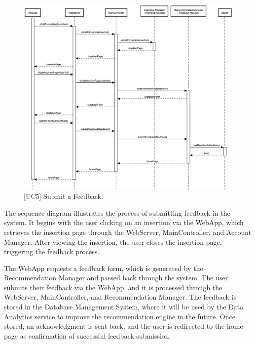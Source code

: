 \newpage

\begin{figure}[htbp]
    \centering
    \includegraphics[width=\linewidth]{DD/Images/sequenceDiagrams/SubmitFeedback.png}
    \caption{[UC5] Submit a Feedback.}
    \label{fig:submitFeedback_immagine}
\end{figure}


The sequence diagram illustrates the process of submitting feedback in the system. It begins with the user clicking on an insertion via the WebApp, which retrieves the insertion page through the WebServer, MainController, and Account Manager. After viewing the insertion, the user closes the insertion page, triggering the feedback process.

The WebApp requests a feedback form, which is generated by the Recommendation Manager and passed back through the system. The user submits their feedback via the WebApp, and it is processed through the WebServer, MainController, and Recommendation Manager. The feedback is stored in the Database Management System, where it will be used by the Data Analytics service to improve the recommendation engine in the future. Once stored, an acknowledgment is sent back, and the user is redirected to the home page as confirmation of successful feedback submission.

